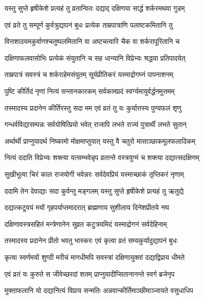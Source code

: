 \twolineshloka
{यस्तु सुप्ते हृषीकेशे प्रत्यहं तु व्रतान्वितः}
{दद्याद् दक्षिणया सार्द्ध शर्करमथवा गुडम्} %

\twolineshloka
{एवं व्रते तु सम्पूर्ण कुर्वत्रुद्यापनं बुधः}
{प्रत्येक ताम्रपात्राणि पलाष्टकमितानि तु} %

\twolineshloka
{वित्तशाठयमकुर्वाणश्चतुष्पलमितानि वा}
{अष्टचत्वारि चैक वा शर्करापूरितानि च} %

\twolineshloka
{दक्षिणाफलवासोभिः प्रत्येकं संयुतानि च}
{सह धान्यानि विप्रेभ्यः श्रद्धया प्रतिपादयेत्} %

\twolineshloka
{ताम्रपात्रं सवस्त्रं च शर्कराहेमसंयुतम्}
{सूर्यप्रीतिकरं यस्माद्रोगघ्नं पापनाशनम्} %

\twolineshloka
{पुष्टि कीर्तिदं नृणां नित्यं सन्तानकारकम्}
{सर्वकामप्रदं स्वर्ग्यमायुर्वर्द्धनमुत्तमम्} %

\twolineshloka
{तस्मादस्य प्रदानेन कीर्तिरस्तु सदा मम}
{एवं व्रतं तु यः कुर्यात्तस्य पुण्यफलं शृणु} %

\twolineshloka
{गन्धर्वविद्यासम्पन्नः सर्वयोषित्प्रियो भवेत्}
{राजापि लभते राज्यं पुत्रार्थी लभते सुतान्} %

\twolineshloka
{अर्थार्थी प्राप्नुयादर्थ निष्कामो मोक्षमाप्तुयात्}
{यस्तु वै चतुरो मासाञ्छाकमूलफलादिकम्} %

\twolineshloka
{नित्यं ददाति विप्रेभ्यः शक्त्या यत्सम्भवेन्नृप}
{व्रतान्ते वस्त्रयुग्मं च शक्त्या दद्यात्सदक्षिणम्} %

\twolineshloka
{सुखीभूत्वा चिरं काल राजयोगी भवेन्नरः}
{सर्वदेवप्रियं यस्माच्छाकं तृप्तिकरं नृणाम्} %

\twolineshloka
{ददामि तेन देवाद्याः सदा कुर्वन्तु मङ्गलम्}
{यस्तु सुप्ते हृषीकेशे प्रत्यहं तु ऋतुद्ये} %

\twolineshloka
{दद्यात्कटुवयं मयों गृहपर्याप्तमादरात्}
{ब्राह्मणाय सुशीलाय दिनेशप्रीतये नघ} %

\twolineshloka
{दक्षिणावस्त्रसहितं मन्त्रेणानेन सुव्रत}
{कटुत्रयमिदं यस्माद्रोगनं सर्वदेहिनाम्} %

\twolineshloka
{तस्मादस्य प्रदानेन प्रीतो भवतु भास्करः}
{एवं कृत्वा व्रतं सम्यकुर्यादुद्यापनं बुधः} %

\twolineshloka
{कृत्वा स्वर्णमयों शुण्ठी मरीचं मागधीमपि}
{सवस्त्रां दक्षिणायुक्तां दद्याद्विप्राय धीमते} %

\twolineshloka
{एवं व्रतं यः कुरुते स जीवेच्छरदां शतम्}
{प्राप्नुयादीप्सितानानन्ते स्वर्ग ब्रजेनृप} %

\twolineshloka
{मुक्ताफलानि यो दद्यानित्यं विप्राय सन्मतिः}
{अन्नवान्कीर्तिमाञ्छीमाञ्जायते वसुधाधिप} %

